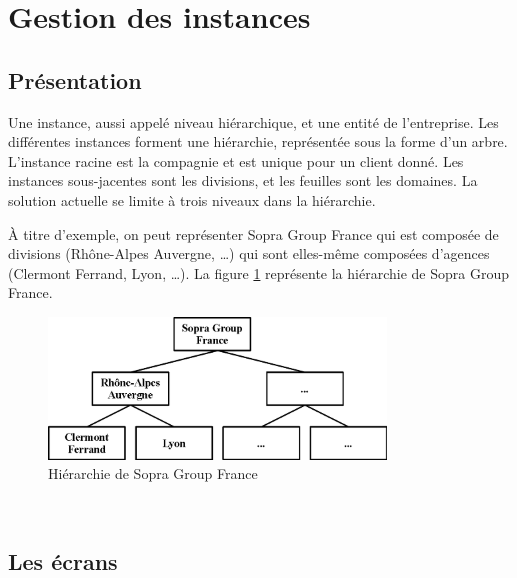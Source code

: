 \section{Gestion des instances}


\subsection{Présentation}

Une instance, aussi appelé niveau hiérarchique, et une entité de l'entreprise.
Les différentes instances forment une hiérarchie, représentée sous la forme d'un arbre.
L'instance racine est la compagnie et est unique pour un client donné.
Les instances sous-jacentes sont les divisions, et les feuilles sont les domaines.
La solution actuelle se limite à trois niveaux dans la hiérarchie.

À titre d'exemple, on peut représenter Sopra Group France qui est composée de divisions (Rhône-Alpes Auvergne, \ldots) qui sont elles-même composées d'agences (Clermont Ferrand, Lyon, \ldots).
La figure \ref{hierarchie_Sopra_Group} représente la hiérarchie de Sopra Group France.
\begin{figure}[!h]
	\center
	\includegraphics[width=0.8\textwidth]{img/hierarchie_Sopra_Group.png}
	\caption{Hiérarchie de Sopra Group France}
	\label{hierarchie_Sopra_Group}
\end{figure}
~~\\


\subsection{Les écrans}

